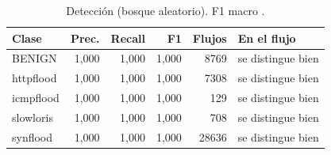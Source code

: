 \begin{table}[H]
\centering
\small
\caption{Detecci\'on (bosque aleatorio). F1 macro \FmacroEs.}
\label{tbl:deteccion}
\begin{tabular}{lrrrrp{2.6cm}}
\hline
Clase & Prec. & Recall & F1 & Flujos & En el flujo \\
\hline
BENIGN & 1,000 & 1,000 & 1,000 & 8769 & se distingue bien \\
httpflood & 1,000 & 1,000 & 1,000 & 7308 & se distingue bien \\
icmpflood & 1,000 & 1,000 & 1,000 & 129 & se distingue bien \\
slowloris & 1,000 & 1,000 & 1,000 & 708 & se distingue bien \\
synflood & 1,000 & 1,000 & 1,000 & 28636 & se distingue bien \\
\hline
\end{tabular}
\end{table}
